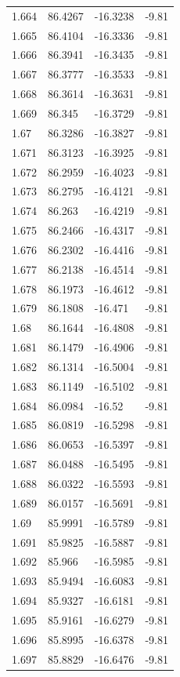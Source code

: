 \begin{tabular}{llll}
1.664 & 86.4267 & -16.3238 & -9.81 \\
1.665 & 86.4104 & -16.3336 & -9.81 \\
1.666 & 86.3941 & -16.3435 & -9.81 \\
1.667 & 86.3777 & -16.3533 & -9.81 \\
1.668 & 86.3614 & -16.3631 & -9.81 \\
1.669 & 86.345 & -16.3729 & -9.81 \\
1.67 & 86.3286 & -16.3827 & -9.81 \\
1.671 & 86.3123 & -16.3925 & -9.81 \\
1.672 & 86.2959 & -16.4023 & -9.81 \\
1.673 & 86.2795 & -16.4121 & -9.81 \\
1.674 & 86.263 & -16.4219 & -9.81 \\
1.675 & 86.2466 & -16.4317 & -9.81 \\
1.676 & 86.2302 & -16.4416 & -9.81 \\
1.677 & 86.2138 & -16.4514 & -9.81 \\
1.678 & 86.1973 & -16.4612 & -9.81 \\
1.679 & 86.1808 & -16.471 & -9.81 \\
1.68 & 86.1644 & -16.4808 & -9.81 \\
1.681 & 86.1479 & -16.4906 & -9.81 \\
1.682 & 86.1314 & -16.5004 & -9.81 \\
1.683 & 86.1149 & -16.5102 & -9.81 \\
1.684 & 86.0984 & -16.52 & -9.81 \\
1.685 & 86.0819 & -16.5298 & -9.81 \\
1.686 & 86.0653 & -16.5397 & -9.81 \\
1.687 & 86.0488 & -16.5495 & -9.81 \\
1.688 & 86.0322 & -16.5593 & -9.81 \\
1.689 & 86.0157 & -16.5691 & -9.81 \\
1.69 & 85.9991 & -16.5789 & -9.81 \\
1.691 & 85.9825 & -16.5887 & -9.81 \\
1.692 & 85.966 & -16.5985 & -9.81 \\
1.693 & 85.9494 & -16.6083 & -9.81 \\
1.694 & 85.9327 & -16.6181 & -9.81 \\
1.695 & 85.9161 & -16.6279 & -9.81 \\
1.696 & 85.8995 & -16.6378 & -9.81 \\
1.697 & 85.8829 & -16.6476 & -9.81 \\

\end{tabular}
